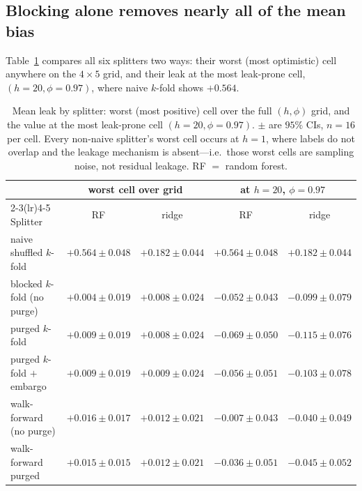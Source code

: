 \documentclass[11pt]{article}
\begin{document}
\subsection{Blocking alone removes nearly all of the mean bias}
\label{sec:blocking}

Table~\ref{tab:splitters} compares all six splitters two ways: their worst
(most optimistic) cell anywhere on the $4 \times 5$ grid, and their leak at
the most leak-prone cell, $(h{=}20, \phi{=}0.97)$, where naive $k$-fold
shows $+0.564$.

\begin{table}[t]
\centering
\caption{Mean leak by splitter: worst (most positive) cell over the full
$(h,\phi)$ grid, and the value at the most leak-prone cell
$(h{=}20, \phi{=}0.97)$. $\pm$ are $95\%$ CIs, $n=16$ per cell. Every
non-naive splitter's worst cell occurs at $h=1$, where labels do not overlap
and the leakage mechanism is absent---i.e.\ those worst cells are sampling
noise, not residual leakage. RF $=$ random forest.}
\label{tab:splitters}
\small
\begin{tabular}{lcc@{\hskip 1.8em}cc}
\toprule
& \multicolumn{2}{c}{worst cell over grid} & \multicolumn{2}{c}{at $h{=}20$, $\phi{=}0.97$}\\
\cmidrule(lr){2-3}\cmidrule(lr){4-5}
Splitter & RF & ridge & RF & ridge \\
\midrule
naive shuffled $k$-fold       & $+0.564 \pm 0.048$ & $+0.182 \pm 0.044$ & $+0.564 \pm 0.048$ & $+0.182 \pm 0.044$ \\
blocked $k$-fold (no purge)   & $+0.004 \pm 0.019$ & $+0.008 \pm 0.024$ & $-0.052 \pm 0.043$ & $-0.099 \pm 0.079$ \\
purged $k$-fold               & $+0.009 \pm 0.019$ & $+0.008 \pm 0.024$ & $-0.069 \pm 0.050$ & $-0.115 \pm 0.076$ \\
purged $k$-fold $+$ embargo   & $+0.009 \pm 0.019$ & $+0.009 \pm 0.024$ & $-0.056 \pm 0.051$ & $-0.103 \pm 0.078$ \\
walk-forward (no purge)       & $+0.016 \pm 0.017$ & $+0.012 \pm 0.021$ & $-0.007 \pm 0.043$ & $-0.040 \pm 0.049$ \\
walk-forward purged           & $+0.015 \pm 0.015$ & $+0.012 \pm 0.021$ & $-0.036 \pm 0.051$ & $-0.045 \pm 0.052$ \\
\bottomrule
\end{tabular}
\end{table}
\end{document}
